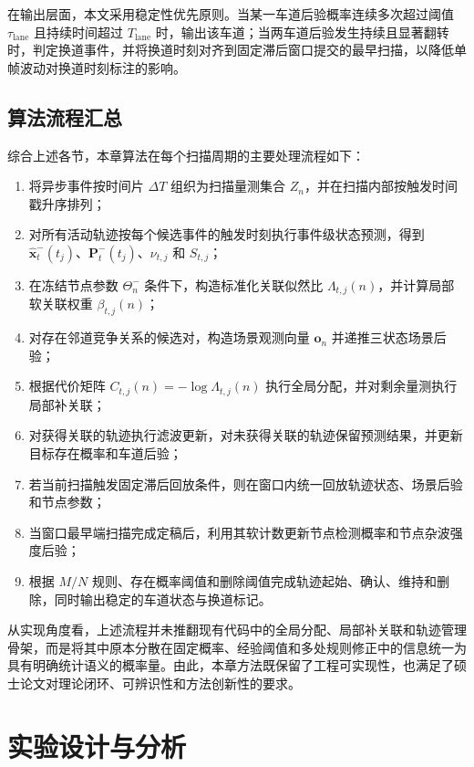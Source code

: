 \documentclass{xdupgthesis}
\begin{document}
在输出层面，本文采用稳定性优先原则。当某一车道后验概率连续多次超过阈值 $\tau_{\mathrm{lane}}$ 且持续时间超过 $T_{\mathrm{lane}}$ 时，输出该车道；当两车道后验发生持续且显著翻转时，判定换道事件，并将换道时刻对齐到固定滞后窗口提交的最早扫描，以降低单帧波动对换道时刻标注的影响。

\subsection{算法流程汇总}

综合上述各节，本章算法在每个扫描周期的主要处理流程如下：
\begin{enumerate}
	\item 将异步事件按时间片 $\Delta T$ 组织为扫描量测集合 $Z_n$，并在扫描内部按触发时间戳升序排列；
	\item 对所有活动轨迹按每个候选事件的触发时刻执行事件级状态预测，得到 $\hat{\mathbf x}^-_t(t_j)$、$\mathbf P^-_t(t_j)$、$\nu_{t,j}$ 和 $S_{t,j}$；
	\item 在冻结节点参数 $\Theta_n^{-}$ 条件下，构造标准化关联似然比 $\Lambda_{t,j}(n)$，并计算局部软关联权重 $\beta_{t,j}(n)$；
	\item 对存在邻道竞争关系的候选对，构造场景观测向量 $\mathbf o_n$ 并递推三状态场景后验；
	\item 根据代价矩阵 $C_{t,j}(n)=-\log\Lambda_{t,j}(n)$ 执行全局分配，并对剩余量测执行局部补关联；
	\item 对获得关联的轨迹执行滤波更新，对未获得关联的轨迹保留预测结果，并更新目标存在概率和车道后验；
	\item 若当前扫描触发固定滞后回放条件，则在窗口内统一回放轨迹状态、场景后验和节点参数；
	\item 当窗口最早端扫描完成定稿后，利用其软计数更新节点检测概率和节点杂波强度后验；
	\item 根据 $M/N$ 规则、存在概率阈值和删除阈值完成轨迹起始、确认、维持和删除，同时输出稳定的车道状态与换道标记。
\end{enumerate}

从实现角度看，上述流程并未推翻现有代码中的全局分配、局部补关联和轨迹管理骨架，而是将其中原本分散在固定概率、经验阈值和多处规则修正中的信息统一为具有明确统计语义的概率量。由此，本章方法既保留了工程可实现性，也满足了硕士论文对理论闭环、可辨识性和方法创新性的要求。

\section{实验设计与分析}
\label{sec:ch3_experiment}
\end{document}
